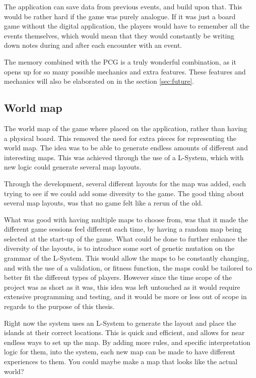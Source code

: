 The application can save data from previous events, and build upon that. This would be rather hard if the game was purely analogue. If it was just a board game without the digital application, the players would have to remember all the events themselves, which would mean that they would constantly be writing down notes during and after each encounter with an event.

The memory combined with the PCG is a truly wonderful combination, as it opens up for so many possible mechanics and extra features. These features and mechanics will also be elaborated on in the section \ref{sec:future}.

\subsection{World map}
The world map of the game where placed on the application, rather than having a physical board.
This removed the need for extra pieces for representing the world map. 
The idea was to be able to generate endless amounts of different and interesting maps. This was achieved through the use of a L-System, which with new logic could generate several map layouts.

Through the development, several different layouts for the map was added, each trying to see if we could add some diversity to the game.
The good thing about several map layouts, was that no game felt like a rerun of the old.

What was good with having multiple maps to choose from, was that it made the different game sessions feel different each time, by having a random map being selected at the start-up of the game. What could be done to further enhance the diversity of the layouts, is to introduce some sort of genetic mutation on the grammar of the L-System. This would allow the maps to be constantly changing, and with the use of a validation, or fitness function, the maps could be tailored to better fit the different types of players. However since the time scope of the project was as short as it was, this idea was left untouched as it would require extensive programming and testing, and it would be more or less out of scope in regards to the purpose of this thesis.

Right now the system uses an L-System to generate the layout and place the islands at their correct locations.
This is quick and efficient, and allows for near endless ways to set up the map. By adding more rules, and specific  interpretation logic for them, into the system, each new map can be made to have different experiences to them.  You could maybe make a map that looks like the actual world? 

